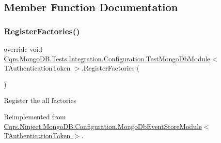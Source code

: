 \subsection{Member Function Documentation}
\mbox{\label{classCqrs_1_1MongoDB_1_1Tests_1_1Integration_1_1Configuration_1_1TestMongoDbModule_aa8a3a1f8c74becc8bb36008abe2c6e0f_aa8a3a1f8c74becc8bb36008abe2c6e0f}} 
\subsubsection{\texorpdfstring{Register\+Factories()}{RegisterFactories()}}
{\footnotesize\ttfamily override void \hyperlink{classCqrs_1_1MongoDB_1_1Tests_1_1Integration_1_1Configuration_1_1TestMongoDbModule}{Cqrs.\+Mongo\+D\+B.\+Tests.\+Integration.\+Configuration.\+Test\+Mongo\+Db\+Module}$<$ T\+Authentication\+Token $>$.Register\+Factories (\begin{DoxyParamCaption}{ }\end{DoxyParamCaption})\hspace{0.3cm}{\ttfamily [virtual]}}



Register the all factories 



Reimplemented from \hyperlink{classCqrs_1_1Ninject_1_1MongoDB_1_1Configuration_1_1MongoDbEventStoreModule_a32cbf7060777484eb68c4dc032109e6c_a32cbf7060777484eb68c4dc032109e6c}{Cqrs.\+Ninject.\+Mongo\+D\+B.\+Configuration.\+Mongo\+Db\+Event\+Store\+Module$<$ T\+Authentication\+Token $>$}.

